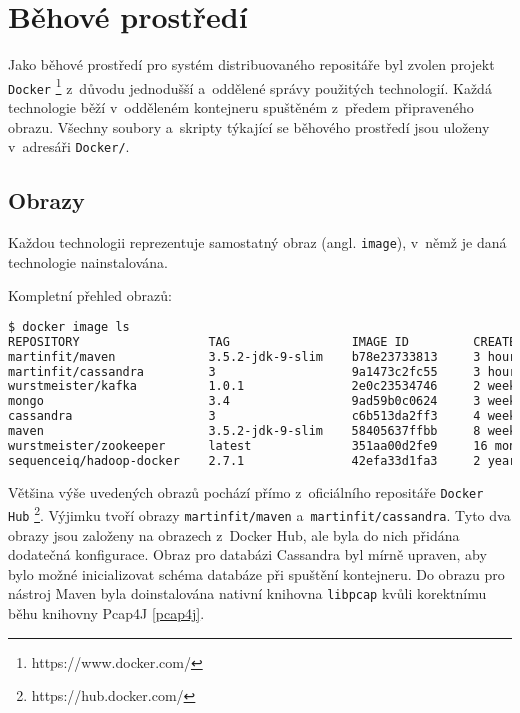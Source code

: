 \chapter{Běhové prostředí}
Jako běhové prostředí pro systém distribuovaného repositáře byl zvolen projekt \texttt{Docker} \footnote{https://www.docker.com/} z~důvodu jednodušší a~oddělené správy použitých technologií. Každá technologie běží v~odděleném kontejneru spuštěném z~předem připraveného obrazu. Všechny soubory a~skripty týkající se běhového prostředí jsou uloženy v~adresáři \texttt{Docker/}.

\section{Obrazy}
Každou technologii reprezentuje samostatný obraz (angl. \texttt{image}), v~němž je daná technologie nainstalována.

\vspace{0.5cm}
\noindent Kompletní přehled obrazů:

\begin{lstlisting}[language=bash,basicstyle={\small\ttfamily}]
$ docker image ls
REPOSITORY                  TAG                 IMAGE ID         CREATED          SIZE
martinfit/maven             3.5.2-jdk-9-slim    b78e23733813     3 hours ago      449MB
martinfit/cassandra         3                   9a1473c2fc55     3 hours ago      323MB
wurstmeister/kafka          1.0.1               2e0c23534746     2 weeks ago      330MB
mongo                       3.4                 9ad59b0c0624     3 weeks ago      360MB
cassandra                   3                   c6b513da2ff3     4 weeks ago      323MB
maven                       3.5.2-jdk-9-slim    58405637ffbb     8 weeks ago      392MB
wurstmeister/zookeeper      latest              351aa00d2fe9     16 months ago    478MB
sequenceiq/hadoop-docker    2.7.1               42efa33d1fa3     2 years ago      1.76GB
\end{lstlisting}

\noindent Většina výše uvedených obrazů pochází přímo z~oficiálního repositáře \texttt{Docker Hub} \footnote{https://hub.docker.com/}. Výjimku tvoří obrazy \texttt{martinfit/maven} a~\texttt{martinfit/cassandra}. Tyto dva obrazy jsou založeny na obrazech z~Docker Hub, ale byla do nich přidána dodatečná konfigurace. Obraz pro databázi Cassandra byl mírně upraven, aby bylo možné inicializovat schéma databáze při spuštění kontejneru. Do obrazu pro nástroj Maven byla doinstalována nativní knihovna \texttt{libpcap} kvůli korektnímu běhu knihovny Pcap4J \ref{pcap4j}.

